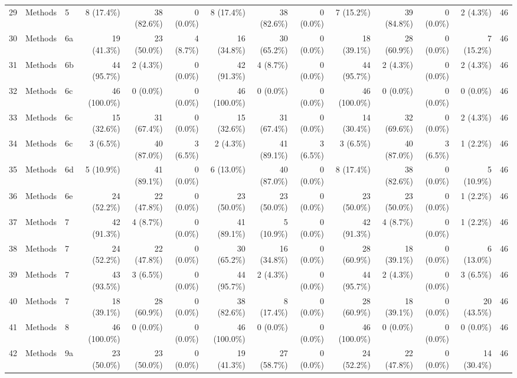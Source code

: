 \begin{longtable}{@{}rll*{11}{r}@{}}
29 & Methods & 5 & 8 (17.4\%) & 38 (82.6\%) & 0 (0.0\%) & 8 (17.4\%) & 38 (82.6\%) & 0 (0.0\%) & 7 (15.2\%) & 39 (84.8\%) & 0 (0.0\%) & 2 (4.3\%) & 46 \\
30 & Methods & 6a & 19 (41.3\%) & 23 (50.0\%) & 4 (8.7\%) & 16 (34.8\%) & 30 (65.2\%) & 0 (0.0\%) & 18 (39.1\%) & 28 (60.9\%) & 0 (0.0\%) & 7 (15.2\%) & 46 \\
31 & Methods & 6b & 44 (95.7\%) & 2 (4.3\%) & 0 (0.0\%) & 42 (91.3\%) & 4 (8.7\%) & 0 (0.0\%) & 44 (95.7\%) & 2 (4.3\%) & 0 (0.0\%) & 2 (4.3\%) & 46 \\
32 & Methods & 6c & 46 (100.0\%) & 0 (0.0\%) & 0 (0.0\%) & 46 (100.0\%) & 0 (0.0\%) & 0 (0.0\%) & 46 (100.0\%) & 0 (0.0\%) & 0 (0.0\%) & 0 (0.0\%) & 46 \\
33 & Methods & 6c & 15 (32.6\%) & 31 (67.4\%) & 0 (0.0\%) & 15 (32.6\%) & 31 (67.4\%) & 0 (0.0\%) & 14 (30.4\%) & 32 (69.6\%) & 0 (0.0\%) & 2 (4.3\%) & 46 \\
34 & Methods & 6c & 3 (6.5\%) & 40 (87.0\%) & 3 (6.5\%) & 2 (4.3\%) & 41 (89.1\%) & 3 (6.5\%) & 3 (6.5\%) & 40 (87.0\%) & 3 (6.5\%) & 1 (2.2\%) & 46 \\
35 & Methods & 6d & 5 (10.9\%) & 41 (89.1\%) & 0 (0.0\%) & 6 (13.0\%) & 40 (87.0\%) & 0 (0.0\%) & 8 (17.4\%) & 38 (82.6\%) & 0 (0.0\%) & 5 (10.9\%) & 46 \\
36 & Methods & 6e & 24 (52.2\%) & 22 (47.8\%) & 0 (0.0\%) & 23 (50.0\%) & 23 (50.0\%) & 0 (0.0\%) & 23 (50.0\%) & 23 (50.0\%) & 0 (0.0\%) & 1 (2.2\%) & 46 \\
37 & Methods & 7 & 42 (91.3\%) & 4 (8.7\%) & 0 (0.0\%) & 41 (89.1\%) & 5 (10.9\%) & 0 (0.0\%) & 42 (91.3\%) & 4 (8.7\%) & 0 (0.0\%) & 1 (2.2\%) & 46 \\
38 & Methods & 7 & 24 (52.2\%) & 22 (47.8\%) & 0 (0.0\%) & 30 (65.2\%) & 16 (34.8\%) & 0 (0.0\%) & 28 (60.9\%) & 18 (39.1\%) & 0 (0.0\%) & 6 (13.0\%) & 46 \\
39 & Methods & 7 & 43 (93.5\%) & 3 (6.5\%) & 0 (0.0\%) & 44 (95.7\%) & 2 (4.3\%) & 0 (0.0\%) & 44 (95.7\%) & 2 (4.3\%) & 0 (0.0\%) & 3 (6.5\%) & 46 \\
40 & Methods & 7 & 18 (39.1\%) & 28 (60.9\%) & 0 (0.0\%) & 38 (82.6\%) & 8 (17.4\%) & 0 (0.0\%) & 28 (60.9\%) & 18 (39.1\%) & 0 (0.0\%) & 20 (43.5\%) & 46 \\
41 & Methods & 8 & 46 (100.0\%) & 0 (0.0\%) & 0 (0.0\%) & 46 (100.0\%) & 0 (0.0\%) & 0 (0.0\%) & 46 (100.0\%) & 0 (0.0\%) & 0 (0.0\%) & 0 (0.0\%) & 46 \\
42 & Methods & 9a & 23 (50.0\%) & 23 (50.0\%) & 0 (0.0\%) & 19 (41.3\%) & 27 (58.7\%) & 0 (0.0\%) & 24 (52.2\%) & 22 (47.8\%) & 0 (0.0\%) & 14 (30.4\%) & 46 \\

\end{longtable}
